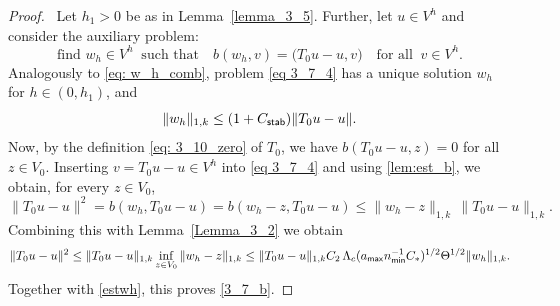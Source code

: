 \documentclass[numbers,webpdf,imaiai]{ima-authoring-template}%
\theoremstyle{thmstyletwo}%
\numberwithin{equation}{section}
\newcommand{\Cstar}{C_{\ast}}
\numberwithin{equation}{section}
\newcommand{\Cstab}{C_{\textup{\textsf{stab}}}}
\newcommand{\amax}{a_{\textup{\textsf{max}}}}
\newcommand{\nmin}{n_{\textup{\textsf{min}}}}
\begin{document}
{\begin{proof}\,
Let $h_1>0$ be as in Lemma~\ref{lemma_3_5}.
Further, let $u \in V^h$ and consider the auxiliary problem: 
\begin{equation}\label{eq 3_7_4}
	\text{find } w_h \in V^h \;\; \text{such that} \quad b(w_h, v) = \bigl(T_0 u - u,v\bigr) \quad \text{for all} \;\; v \in V^h. 
\end{equation}
Analogously to \eqref{eq: w_h_comb}, problem \eqref{eq 3_7_4} has a unique solution $w_h$  for $h\in(0,h_1)$, and 
\begin{equation} \label{estwh} 
	\|w_h\|_{1,k} \le (1+\Cstab) \|T_0 u - u\|. 
\end{equation}
Now, by the definition \eqref{eq: 3_10_zero} of $T_0$, we have $b(T_0 u-u,z)=0$ for all $z \in V_0$.
Inserting $v = T_0 u - u \in V^h$ into \eqref{eq 3_7_4} and using \eqref{lem:est_b}, we obtain, for every $z\in V_0$,
\begin{equation*}
	\|T_0 u - u\|^2 = b(w_h, T_0 u - u)
	= b(w_h - z, T_0 u - u)
	\le \|w_h-z\|_{1,k}\,\|T_0 u - u\|_{1,k}.
\end{equation*}
Combining this with Lemma~\ref{Lemma_3_2} we obtain
\begin{equation}\label{ineq:T0u-u}
	\|T_0 u - u\|^2 \le \|T_0 u - u\|_{1,k}\inf_{z \in V_0}\|w_h-z\|_{1,k} 
	\le \|T_0 u - u\|_{1,k} {C_2}\, \Lambda_c (\amax \nmin^{-1} \Cstar)^{1/2}
	\Theta^{1/2} \|w_h\|_{1,k}.
\end{equation}
Together with \eqref{estwh}, this proves \eqref{3_7_b}. 


\end{proof}}
\end{document}
